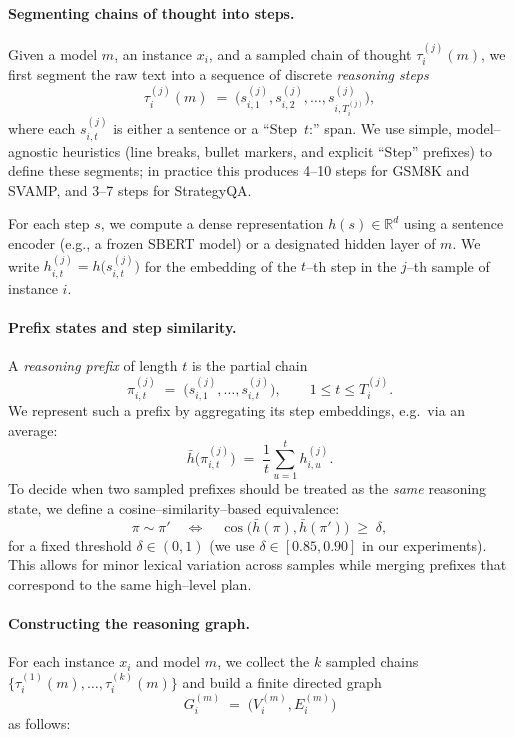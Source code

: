\paragraph{Segmenting chains of thought into steps.}
Given a model $m$, an instance $x_i$, and a sampled chain of thought
$\tau_i^{(j)}(m)$, we first segment the raw text into a sequence of
discrete \emph{reasoning steps}
\[
  \tau_i^{(j)}(m)
  \;=\;
  \bigl(s_{i,1}^{(j)}, s_{i,2}^{(j)}, \dots, s_{i,T_{i}^{(j)}}^{(j)}\bigr),
\]
where each $s_{i,t}^{(j)}$ is either a sentence or a ``Step~$t$:''
span.
We use simple, model--agnostic heuristics (line breaks, bullet markers,
and explicit ``Step'' prefixes) to define these segments; in practice
this produces 4--10 steps for GSM8K and SVAMP, and 3--7 steps for
StrategyQA.

For each step $s$, we compute a dense representation
$h(s) \in \mathbb{R}^d$ using a sentence encoder
(e.g., a frozen SBERT model) or a designated hidden layer of $m$.
We write $h_{i,t}^{(j)} = h\bigl(s_{i,t}^{(j)}\bigr)$ for the
embedding of the $t$--th step in the $j$--th sample of instance $i$.

\paragraph{Prefix states and step similarity.}
A \emph{reasoning prefix} of length $t$ is the partial chain
\[
  \pi_{i,t}^{(j)}
  \;=\;
  \bigl(s_{i,1}^{(j)}, \dots, s_{i,t}^{(j)}\bigr),
  \qquad
  1 \le t \le T_{i}^{(j)}.
\]
We represent such a prefix by aggregating its step embeddings, e.g.\ via
an average:
\[
  \bar{h}\bigl(\pi_{i,t}^{(j)}\bigr)
  \;=\;
  \frac{1}{t} \sum_{u=1}^{t} h_{i,u}^{(j)}.
\]
To decide when two sampled prefixes should be treated as the
\emph{same} reasoning state, we define a cosine--similarity--based
equivalence:
\[
  \pi \sim \pi'
  \quad\Longleftrightarrow\quad
  \cos\bigl(\bar{h}(\pi), \bar{h}(\pi')\bigr)
  \;\ge\; \delta,
\]
for a fixed threshold $\delta \in (0,1)$ (we use
$\delta \in [0.85, 0.90]$ in our experiments).
This allows for minor lexical variation across samples while merging
prefixes that correspond to the same high--level plan.

\paragraph{Constructing the reasoning graph.}
For each instance $x_i$ and model $m$, we collect the $k$ sampled chains
$\{\tau_i^{(1)}(m), \dots, \tau_i^{(k)}(m)\}$ and build a finite
directed graph
\[
  G_i^{(m)} \;=\; \bigl(V_i^{(m)}, E_i^{(m)}\bigr)
\]
as follows:

